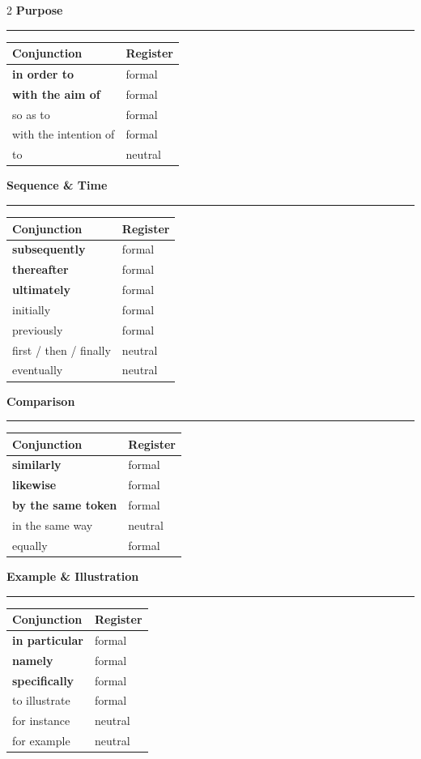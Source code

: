 \documentclass[11pt,a4paper]{article}
\newcommand{\sectionheading}[1]{%
  \vspace{6pt}%
  {\color{konstanzblue}\large\textbf{#1}}\\[-4pt]%
  {\color{konstanzblue}\rule{\linewidth}{1.5pt}}%
  \vspace{2pt}%
}
\begin{document}
\begin{multicols}{2}
\vspace{10pt}
\sectionheading{Purpose}
\begin{tabular}{@{}ll@{}}
\toprule
\textbf{Conjunction} & \textbf{Register} \\
\midrule
\textbf{in order to} & formal \\
\textbf{with the aim of} & formal \\
so as to & formal \\
with the intention of & formal \\
to & neutral \\
\bottomrule
\end{tabular}

\vspace{10pt}
\sectionheading{Sequence \& Time}
\begin{tabular}{@{}ll@{}}
\toprule
\textbf{Conjunction} & \textbf{Register} \\
\midrule
\textbf{subsequently} & formal \\
\textbf{thereafter} & formal \\
\textbf{ultimately} & formal \\
initially & formal \\
previously & formal \\
first / then / finally & neutral \\
eventually & neutral \\
\bottomrule
\end{tabular}

\vspace{10pt}
\sectionheading{Comparison}
\begin{tabular}{@{}ll@{}}
\toprule
\textbf{Conjunction} & \textbf{Register} \\
\midrule
\textbf{similarly} & formal \\
\textbf{likewise} & formal \\
\textbf{by the same token} & formal \\
in the same way & neutral \\
equally & formal \\
\bottomrule
\end{tabular}

\vspace{10pt}
\sectionheading{Example \& Illustration}
\begin{tabular}{@{}ll@{}}
\toprule
\textbf{Conjunction} & \textbf{Register} \\
\midrule
\textbf{in particular} & formal \\
\textbf{namely} & formal \\
\textbf{specifically} & formal \\
to illustrate & formal \\
for instance & neutral \\
for example & neutral \\
\bottomrule
\end{tabular}


\end{multicols}
\end{document}
